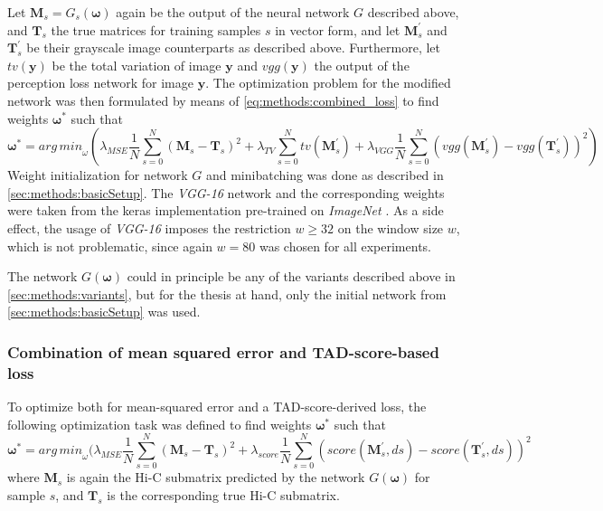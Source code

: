 Let $\mathbf{M}_s=G_s(\bm{\omega})$ again be the output of the neural network $G$ described above, and $\mathbf{T}_s$ the true matrices for training samples $s$ in vector form,
and let $\mathbf{M}^\prime_s$ and $\mathbf{T}^\prime_s$ be their grayscale image counterparts as described above.
Furthermore, let $\mathit{tv}(\bm{y})$ be the total variation of image $\bm{y}$ and $\mathit{vgg}(\bm{y})$ the output of the perception loss network for image $\bm{y}$.
The optimization problem for the modified network was then formulated by means of \cref{eq:methods:combined_loss} to find weights $\bm{\omega}^*$ such that
\begin{equation}
 \bm{\omega}^* = \mathit{arg\,min}_\omega (  \lambda_\mathit{MSE} \frac{1}{N} \sum_{s=0}^N (\mathbf{M}_s - \mathbf{T}_s)^2 
                                                     + \lambda_\mathit{TV} \sum_{s=0}^N \mathit{tv}( \mathbf{M}^\prime_s) 
                                                     + \lambda_\mathit{VGG} \frac{1}{N} \sum_{s=0}^N (\mathit{vgg}(\mathbf{M}^\prime_s) - \mathit{vgg}(\mathbf{T}^\prime_s))^2 ) \label{eq:methods:combined_loss}
\end{equation}
Weight initialization for network $G$ and minibatching was done as described in \cref{sec:methods:basicSetup}.
The \emph{VGG-16} network and the corresponding weights were taken from the keras \cite{Chollet2015} implementation pre-trained on \emph{ImageNet} \cite{deng2009}.
As a side effect, the usage of \emph{VGG-16} imposes the restriction $w \geq 32$ on the window size $w$, which is not problematic, since again $w=80$ was chosen for all experiments.

The network $G(\bm{\omega})$ could in principle be any of the variants described above in \cref{sec:methods:variants},
but for the thesis at hand, only the initial network from \cref{sec:methods:basicSetup} was used.

\subsubsection{Combination of mean squared error and TAD-score-based loss} \label{sec:methods:score_loss}
To optimize both for mean-squared error and a TAD-score-derived loss, the following optimization task was defined to find weights $\bm{\omega}^*$ such that
\begin{equation}
 \bm{\omega}^* = \mathit{arg\,min}_\omega (  \lambda_\mathit{MSE} \frac{1}{N} \sum_{s=0}^N (\mathbf{M}_s - \mathbf{T}_s)^2
                                                    + \lambda_\mathit{score} \frac{1}{N} \sum_{s=0}^N (\mathit{score}(\mathbf{M}^\prime_s,ds) - \mathit{score}(\mathbf{T}^\prime_s,ds))^2 \label{eq:methods:score_loss}
\end{equation}
where $\mathbf{M}_s$ is again the Hi-C submatrix predicted by the network $G(\bm{\omega})$ for sample $s$, and $\mathbf{T}_s$ is the corresponding true Hi-C submatrix.

